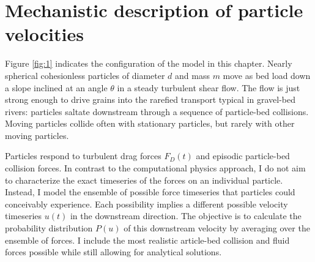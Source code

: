 \section{Mechanistic description of particle velocities}
\label{sec:langmodel}

Figure \ref{fig:1} indicates the configuration of the model in this chapter.
Nearly spherical cohesionless particles of diameter $d$ and mass $m$ move as bed load down a slope inclined at an angle $\theta$ in a steady turbulent shear flow.
The flow is just strong enough to drive grains into the rarefied transport typical in gravel-bed rivers: particles saltate downstream through a sequence of particle-bed collisions. 
Moving particles collide often with stationary particles, but rarely with other moving particles.

Particles respond to turbulent drag forces $F_D(t)$ and episodic particle-bed collision forces. In contrast to the computational physics approach, I do not aim to characterize the exact timeseries of the forces on an individual particle. Instead, I model the ensemble of possible force timeseries that particles could conceivably experience. Each possibility implies a different possible velocity timeseries $u(t)$ in the downstream direction.
The objective is to calculate the probability distribution $P(u)$ of this downstream velocity by averaging over the ensemble of forces.
I include the most realistic article-bed collision and fluid forces possible while still allowing for analytical solutions. 

